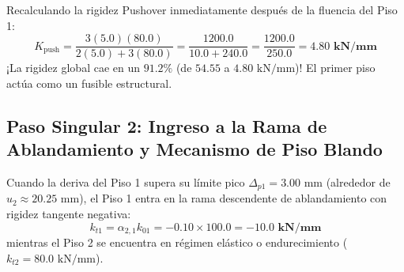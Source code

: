 \documentclass[11pt,letterpaper]{article}
\begin{document}
Recalculando la rigidez Pushover inmediatamente después de la fluencia del Piso 1:
\begin{equation}
    K_{\text{push}} = \frac{3(5.0)(80.0)}{2(5.0) + 3(80.0)} = \frac{1200.0}{10.0 + 240.0} = \frac{1200.0}{250.0} = \mathbf{4.80\text{ kN/mm}}
\end{equation}
¡La rigidez global cae en un $91.2\%$ (de $54.55$ a $4.80\text{ kN/mm}$)! El primer piso actúa como un fusible estructural.

\subsection{Paso Singular 2: Ingreso a la Rama de Ablandamiento y Mecanismo de Piso Blando}

Cuando la deriva del Piso 1 supera su límite pico $\Delta_{p1} = 3.00\text{ mm}$ (alrededor de $u_2 \approx 20.25\text{ mm}$), el Piso 1 entra en la rama descendente de ablandamiento con rigidez tangente negativa:
\begin{equation}
    k_{t1} = \alpha_{2,1} k_{01} = -0.10 \times 100.0 = \mathbf{-10.0\text{ kN/mm}}
\end{equation}
mientras el Piso 2 se encuentra en régimen elástico o endurecimiento ($k_{t2} = 80.0\text{ kN/mm}$).
\end{document}
